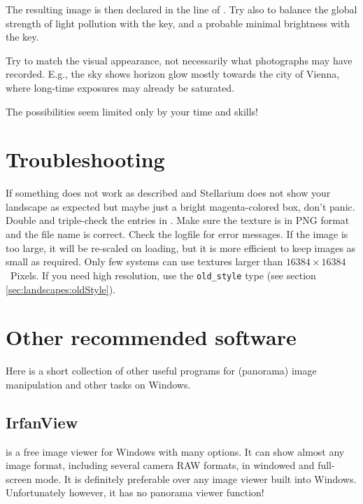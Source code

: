 The resulting image is then declared in the  line
of . Try also to balance the global strength of
light pollution with the  key, and a probable
minimal brightness with the  key.

Try to match the visual appearance, not necessarily what photographs
may have recorded. E.g., the  sky shows horizon
glow mostly towards the city of Vienna, where long-time exposures may
already be saturated.

The possibilities seem limited only by your time and skills!

\section{Troubleshooting}
\label{sec:landscapes:Troubleshooting}

If something does not work as described and Stellarium does not show
your landscape as expected but maybe just a bright magenta-colored
box, don't panic.  Double and triple-check the entries in
.  Make sure the texture is in
PNG format and the file name is correct. Check the logfile for error
messages. If the image is too large, it will be re-scaled on loading,
but it is more efficient to keep images as small as required. Only few
systems can use textures larger than $16384\times16384$~Pixels. If you
need high resolution, use the \texttt{old\_style} type (see section
\ref{sec:landscapes:oldStyle}).

\section{Other recommended software}
\label{sec:landscapes:otherSoftware}

Here is a short collection of other useful programs for (panorama)
image manipulation and other tasks on Windows.


\subsection{IrfanView}
\label{sec:landscapes:IrfanView}

 is a free image viewer for Windows with many
options. It can show almost any image format, including several camera
RAW formats, in windowed and full-screen mode. It is definitely
preferable over any image viewer built into Windows. Unfortunately
however, it has no panorama viewer function!

